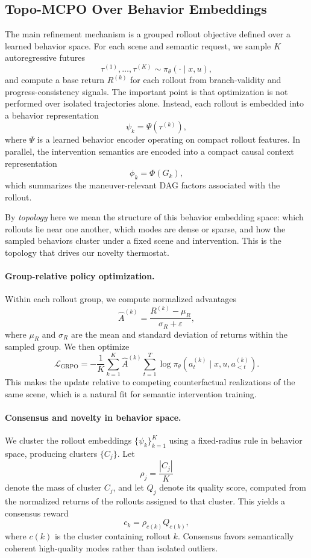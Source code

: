 \documentclass{article}
\begin{document}
\subsection{Topo-MCPO Over Behavior Embeddings}
\label{sec:topo-mcpo}

The main refinement mechanism is a grouped rollout objective defined over a learned behavior space. For each scene and semantic request, we sample $K$ autoregressive futures
\[
\tau^{(1)},\dots,\tau^{(K)} \sim \pi_\theta(\cdot \mid x,u),
\]
and compute a base return $R^{(k)}$ for each rollout from branch-validity and progress-consistency signals. The important point is that optimization is not performed over isolated trajectories alone. Instead, each rollout is embedded into a behavior representation
\[
\psi_k = \Psi(\tau^{(k)}),
\]
where $\Psi$ is a learned behavior encoder operating on compact rollout features. In parallel, the intervention semantics are encoded into a compact causal context representation
\[
\phi_k = \Phi(G_k),
\]
which summarizes the maneuver-relevant DAG factors associated with the rollout.

By \emph{topology} here we mean the structure of this behavior embedding space: which rollouts lie near one another, which modes are dense or sparse, and how the sampled behaviors cluster under a fixed scene and intervention. This is the topology that drives our novelty thermostat.

\paragraph{Group-relative policy optimization.}
Within each rollout group, we compute normalized advantages
\[
\hat{A}^{(k)} = \frac{R^{(k)} - \mu_R}{\sigma_R + \varepsilon},
\]
where $\mu_R$ and $\sigma_R$ are the mean and standard deviation of returns within the sampled group. We then optimize
\[
\mathcal{L}_{\mathrm{GRPO}}
=
-
\frac{1}{K}
\sum_{k=1}^{K}
\hat{A}^{(k)}
\sum_{t=1}^{T}
\log \pi_\theta(a_t^{(k)} \mid x,u,a_{<t}^{(k)}).
\]
This makes the update relative to competing counterfactual realizations of the same scene, which is a natural fit for semantic intervention training.

\paragraph{Consensus and novelty in behavior space.}
We cluster the rollout embeddings $\{\psi_k\}_{k=1}^{K}$ using a fixed-radius rule in behavior space, producing clusters $\{C_j\}$. Let
\[
\rho_j = \frac{|C_j|}{K}
\]
denote the mass of cluster $C_j$, and let $Q_j$ denote its quality score, computed from the normalized returns of the rollouts assigned to that cluster. This yields a consensus reward
\[
c_k = \rho_{c(k)} Q_{c(k)},
\]
where $c(k)$ is the cluster containing rollout $k$. Consensus favors semantically coherent high-quality modes rather than isolated outliers.
\end{document}
